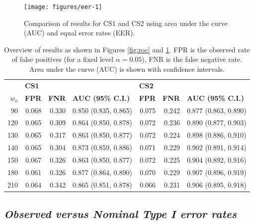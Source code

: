 \documentclass[12pt]{article}
\begin{document}
\begin{figure}

{\centering \texttt{[image: figures/eer-1]} 

}

\caption{Comparison of results for CS1 and CS2 using area under the curve (AUC) and equal error rates (EER). }\label{fig:eer}
\end{figure}

\begin{table}[hbtp]
\centering
\begin{adjustbox}{max width=\textwidth}
\begin{tabular}{rrrlrrl}
  \hline
  & \multicolumn{3}{l}{\bf CS1} & \multicolumn{3}{l}{\bf CS2} \\
$w_o$ & \bf FPR & \bf FNR & \bf AUC (95\% C.I.) & \bf FPR & \bf FNR & \bf AUC (95\% C.I.) \\ 
  \hline
90 & 0.068 & 0.330 & 0.850 (0.835, 0.865) & 0.075 & 0.242 & 0.877 (0.863, 0.890) \\ 
  120 & 0.065 & 0.309 & 0.864 (0.850, 0.878) & 0.072 & 0.236 & 0.890 (0.877, 0.903) \\ 
  130 & 0.065 & 0.317 & 0.863 (0.850, 0.877) & 0.072 & 0.224 & 0.898 (0.886, 0.910) \\ 
  140 & 0.065 & 0.304 & 0.873 (0.859, 0.886) & 0.071 & 0.229 & 0.902 (0.891, 0.914) \\ 
  150 & 0.067 & 0.326 & 0.863 (0.850, 0.877) & 0.072 & 0.225 & 0.904 (0.892, 0.916) \\ 
  180 & 0.061 & 0.326 & 0.877 (0.864, 0.890) & 0.070 & 0.229 & 0.907 (0.896, 0.919) \\ 
  210 & 0.064 & 0.342 & 0.865 (0.851, 0.878) & 0.066 & 0.231 & 0.906 (0.895, 0.918) \\ 
   \hline
\end{tabular}
\end{adjustbox}
\caption{\label{tab:aucs} Overview of results as shown in Figures \ref{fig:roc} and \ref{fig:eer}. FPR is the observed rate of false positives (for a fixed level $\alpha = 0.05$), FNR is the false negative rate. Area under the curve (AUC) is shown with confidence intervals. }
\end{table}

\hypertarget{observed-versus-nominal-type-i-error-rates}{%
\subsection*{\texorpdfstring{\emph{Observed versus Nominal Type I error
rates}}{Observed versus Nominal Type I error rates}}\label{observed-versus-nominal-type-i-error-rates}}
\end{document}
